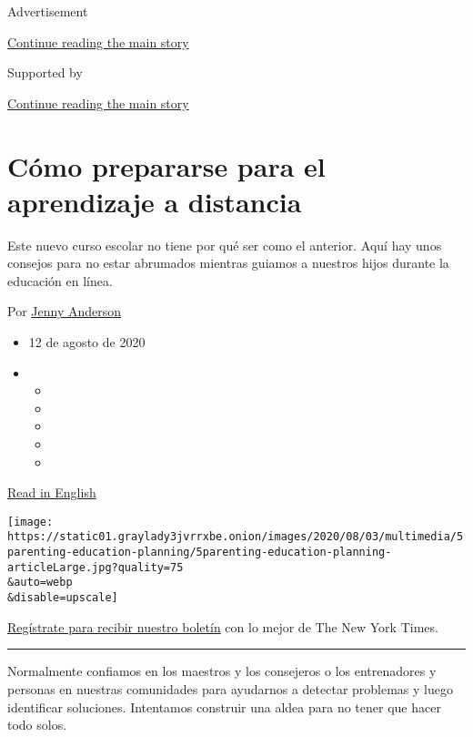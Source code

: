 Advertisement

\protect\hyperlink{after-top}{Continue reading the main story}

Supported by

\protect\hyperlink{after-sponsor}{Continue reading the main story}

\hypertarget{cuxf3mo-prepararse-para-el-aprendizaje-a-distancia}{%
\section{Cómo prepararse para el aprendizaje a
distancia}\label{cuxf3mo-prepararse-para-el-aprendizaje-a-distancia}}

Este nuevo curso escolar no tiene por qué ser como el anterior. Aquí hay
unos consejos para no estar abrumados mientras guiamos a nuestros hijos
durante la educación en línea.

Por \href{https://www.nytimes3xbfgragh.onion/by/jenny-anderson}{Jenny
Anderson}

\begin{itemize}
\item
  12 de agosto de 2020
\item
  \begin{itemize}
  \item
  \item
  \item
  \item
  \item
  \end{itemize}
\end{itemize}

\href{https://www.nytimes3xbfgragh.onion/2020/08/05/parenting/parents-distance-learning.html}{Read
in English}

\texttt{[image: https://static01.graylady3jvrrxbe.onion/images/2020/08/03/multimedia/5parenting-education-planning/5parenting-education-planning-articleLarge.jpg?quality=75\\\&auto=webp\\\&disable=upscale]}

\href{https://www.nytimes3xbfgragh.onion/newsletters/el-times}{Regístrate
para recibir nuestro boletín} con lo mejor de The New York Times.

\begin{center}\rule{0.5\linewidth}{\linethickness}\end{center}

Normalmente confiamos en los maestros y los consejeros o los
entrenadores y personas en nuestras comunidades para ayudarnos a
detectar problemas y luego identificar soluciones. Intentamos construir
una aldea para no tener que hacer todo solos.

